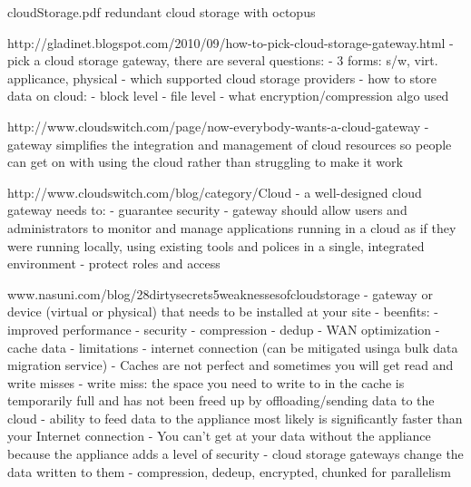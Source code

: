 			cloudStorage.pdf
			redundant cloud storage with octopus
			
			http://gladinet.blogspot.com/2010/09/how-to-pick-cloud-storage-gateway.html 
				- pick a cloud storage gateway, there are several questions:
					- 3 forms: s/w, virt. applicance, physical
					- which supported cloud storage providers
					- how to store data on cloud: 
						- block level
						- file level
					- what encryption/compression algo used
					
			http://www.cloudswitch.com/page/now-everybody-wants-a-cloud-gateway
				- gateway simplifies the integration and management of cloud resources so people can get on with using the cloud rather than struggling to make it work
				
			http://www.cloudswitch.com/blog/category/Cloud%
				- a well-designed cloud gateway needs to:
					- guarantee security
					- gateway should allow users and administrators to monitor and manage applications running in a cloud as if they were running locally, using existing tools and polices in a single, integrated environment
					- protect roles and access
					
www.nasuni.com/blog/28dirtysecrets5weaknessesofcloudstorage  
				- gateway or device (virtual or physical) that needs to be installed at your site
				- beenfits:
					- improved performance
					- security
					- compression
					- dedup
					- WAN optimization
					- cache data
				- limitations
					- internet connection (can be mitigated usinga bulk data migration service)
					- Caches are not perfect and sometimes you will get read and write misses 
						- write miss: the space you need to write to in the cache is temporarily full and has not been freed up by offloading/sending data to the cloud
							-  ability to feed data to the appliance most likely is significantly faster than your Internet connection 
					- You can't get at your data without the appliance because the appliance adds a level of security
				- cloud storage gateways change the data written to them
					- compression, dedeup, encrypted, chunked for parallelism
					
